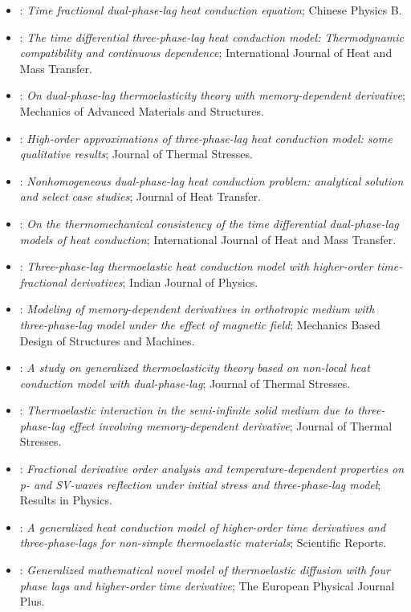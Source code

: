\begin{itemize}
\item \citet{Xu2015}: \emph{Time fractional dual-phase-lag heat conduction equation}; Chinese Physics B.
\item \citet{Chirita2016}: \emph{The time differential three-phase-lag heat conduction model: Thermodynamic compatibility and continuous dependence}; International Journal of Heat and Mass Transfer.
\item \citet{Ezzat2016b}: \emph{On dual-phase-lag thermoelasticity theory with memory-dependent derivative}; Mechanics of Advanced Materials and Structures.
\item \citet{Chirita2017}: \emph{High-order approximations of three-phase-lag heat conduction model: some qualitative results}; Journal of Thermal Stresses.
\item \citet{Julius2017}: \emph{Nonhomogeneous dual-phase-lag heat conduction problem: analytical solution and select case studies}; Journal of Heat Transfer.
\item \citet{Tibullo2017}: \emph{On the thermomechanical consistency of the time differential dual-phase-lag models of heat conduction}; International Journal of Heat and Mass Transfer.
\item \citet{Abouelregal2019}: \emph{Three-phase-lag thermoelastic heat conduction model with higher-order time-fractional derivatives}; Indian Journal of Physics.
\item \citet{Biswas2019}: \emph{Modeling of memory-dependent derivatives in orthotropic medium with three-phase-lag model under the effect of magnetic field}; Mechanics Based Design of Structures and Machines.
\item \citet{Gupta2019}: \emph{A study on generalized thermoelasticity theory based on non-local heat conduction model with dual-phase-lag}; Journal of Thermal Stresses.
\item \citet{Singh2019}: \emph{Thermoelastic interaction in the semi-infinite solid medium due to three-phase-lag effect involving memory-dependent derivative}; Journal of Thermal Stresses.
\item \citet{AboDahab2020}: \emph{Fractional derivative order analysis and temperature-dependent properties on p- and SV-waves reflection under initial stress and three-phase-lag model}; Results in Physics.
\item \citet{Abouelregal2020}: \emph{A generalized heat conduction model of higher-order time derivatives and three-phase-lags for non-simple thermoelastic materials}; Scientific Reports.
\item \citet{Abouelregal2020a}: \emph{Generalized mathematical novel model of thermoelastic diffusion with four phase lags and higher-order time derivative}; The European Physical Journal Plus.

\end{itemize}
